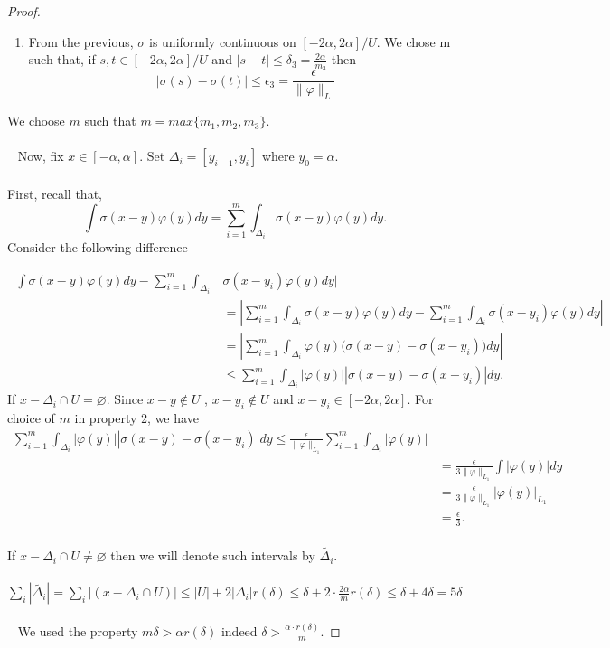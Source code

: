 \documentclass[../main.tex]{subfiles}
\begin{document}
\begin{proof}
\begin{enumerate}
			\item From the previous, $\sigma$ is uniformly continuous on  $[-2\alpha,2\alpha]/ U$. We chose m such that, if $s,t \in [-2\alpha, 2\alpha]/U$ and $|s-t|\leq \delta_3 = \frac{2\alpha}{m_3}$ then $$|\sigma(s)-\sigma(t)| \leq \epsilon_3= \frac{\epsilon}{\|\varphi\|_L}$$
		\end{enumerate}
		We choose $m$ such that $m=max\{m_1,m_2,m_3\}$. \\ \\ 
		Now, fix $x\in [-\alpha,\alpha] $. Set $\Delta_i= [y_{i-1},y_i]$ where $y_0= \alpha$. \\ \\
		First, recall that,\\
		$$\int \sigma(x-y)\varphi(y)dy = \sum_{i=1}^m \int_{\Delta_i}\sigma(x-y)\varphi(y)dy.$$
		Consider the following difference 

\begin{equation*} 
	\begin{split}
		\Bigg| \int \sigma(x-y)\varphi(y)dy -  \sum_{i=1}^m \int_{\Delta_i}& \sigma(x-y_i) \varphi(y)dy \Bigg|  \\
		& = \left|  \sum_{i=1}^m \int_{\Delta_i}\sigma(x-y)\varphi(y)dy -  \sum_{i=1}^m \int_{\Delta_i}\sigma(x-y_i)\varphi(y)dy \right|  \\
		& =  \left|  \sum_{i=1}^m \int_{\Delta_i}\varphi(y)\Big( \sigma(x-y) - \sigma(x-y_i)\Big)dy \right| \\
		&\leq  \sum_{i=1}^m \int_{\Delta_i} \left| \varphi(y)\right| \left| \sigma(x-y)-\sigma(x-y_i)\right|dy.
	\end{split}
\end{equation*}
		If $x-\Delta_i \cap U = \varnothing $. Since $x-y \notin U$ , $x-y_i \notin U$ and $x-y_i \in [-2\alpha,2\alpha]$. For choice of $m$ in property 2, we have\\ 
		\begin{equation*}
			\begin{split}
				\sum_{i=1}^m  \int_{\Delta_i} \left| \varphi(y)\right| \left| \sigma(x-y)-\sigma(x-y_i)\right|dy  \leq  \frac{\epsilon}{\| \varphi\|_{L_1}}  \sum_{i=1}^m  \int_{\Delta_i} \left| \varphi(y)\right| & \\
				& =  \frac{\epsilon}{3\| \varphi\|_{L_1}} \int \left|\varphi(y)\right| dy \\
				& =  \frac{\epsilon}{3\| \varphi\|_{L_1}} \left|\varphi(y)\right|_{L_1}  \\
				& = \frac{\epsilon}{3} .
			\end{split}
		\end{equation*}
		\\ 
		\noindent If $x-\Delta_i \cap U \neq \varnothing$ then we will denote such intervals by $\tilde{\Delta_i}.$\\ \\ 
		$\sum_i |\tilde{\Delta_i}| = \sum_i|(x-\Delta_i \cap U)| \leq |U|+2|\Delta_i| r(\delta) \leq \delta + 2 \cdot \frac{2\alpha}{m} r(\delta) \leq \delta +4\delta = 5\delta$  \\ \\ 
		We used the property $m\delta > \alpha r(\delta) $  indeed $ \delta > \frac{\alpha \cdot r(\delta)}{m}$. 
		

\end{proof}
\end{document}
